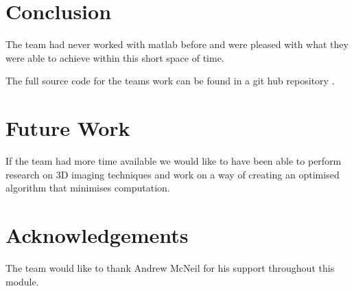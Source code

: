 \documentclass[twocolumn]{article}
\begin{document}
\section{Conclusion}
\vspace{-1ex}

The team had never worked with matlab before and were pleased with what they were able to achieve within this short space of time.
 

The full source code for the teams work can be found in a git hub repository \cite{githublink}.

\section{Future Work} 
\vspace{-1ex}

If the team had more time available we would like to have been able to perform research on 3D imaging techniques and work on a way of creating an optimised algorithm that minimises computation. 


\section*{Acknowledgements}
The team would like to thank Andrew McNeil for his support throughout this module.





\end{document}
